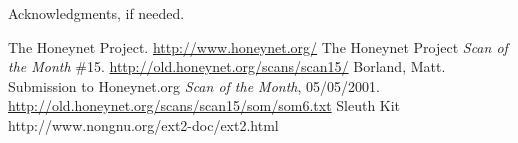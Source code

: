 \documentclass[nocopyrightspace]{sigplanconf}
\begin{document}
\acks

Acknowledgments, if needed.





\begin{thebibliography}{}
\softraggedright

  The Honeynet Project. \url{http://www.honeynet.org/}
  The Honeynet Project \emph{Scan of the Month} \#15.
  \url{http://old.honeynet.org/scans/scan15/}
  Borland, Matt. Submission to Honeynet.org \emph{Scan of the Month},
  05/05/2001. \url{http://old.honeynet.org/scans/scan15/som/som6.txt}
  Sleuth Kit
  http://www.nongnu.org/ext2-doc/ext2.html

\end{thebibliography}
\end{document}
